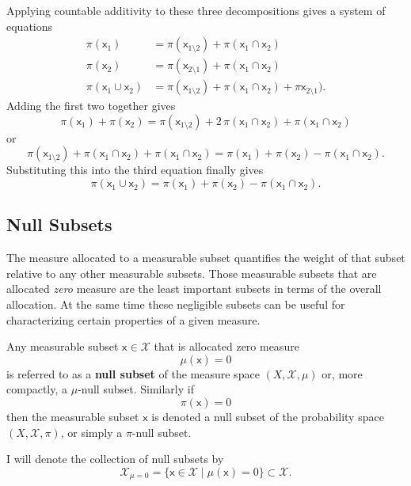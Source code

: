 \documentclass[
  letterpaper,
  DIV=11,
  numbers=noendperiod]{scrartcl}
\begin{document}
Applying countable additivity to these three decompositions gives a
system of equations \begin{align*}
\pi(\mathsf{x}_{1}) &=
\pi(\mathsf{x}_{1 \setminus 2}) + \pi(\mathsf{x}_{1} \cap \mathsf{x}_{2})
\\
\pi(\mathsf{x}_{2}) &=
\pi(\mathsf{x}_{2 \setminus 1}) + \pi(\mathsf{x}_{1} \cap \mathsf{x}_{2})
\\
\pi(\mathsf{x}_{1} \cup \mathsf{x}_{2}) &=
\pi(\mathsf{x}_{1 \setminus 2})
+ \pi(\mathsf{x}_{1} \cap \mathsf{x}_{2})
+ \pi \mathsf{x}_{2 \setminus 1}).
\end{align*} Adding the first two together gives \[
\pi(\mathsf{x}_{1}) + \pi(\mathsf{x}_{2})
=
\pi(\mathsf{x}_{1 \setminus 2})
+ 2 \, \pi(\mathsf{x}_{1} \cap \mathsf{x}_{2})
+ \pi(\mathsf{x}_{1} \cap \mathsf{x}_{2})
\] or \[
\pi(\mathsf{x}_{1 \setminus 2})
+ \pi(\mathsf{x}_{1} \cap \mathsf{x}_{2})
+ \pi(\mathsf{x}_{1} \cap \mathsf{x}_{2})
=
\pi(\mathsf{x}_{1}) + \pi(\mathsf{x}_{2})
- \pi(\mathsf{x}_{1} \cap \mathsf{x}_{2}).
\] Substituting this into the third equation finally gives \[
\pi(\mathsf{x}_{1} \cup \mathsf{x}_{2})
=
\pi(\mathsf{x}_{1}) + \pi(\mathsf{x}_{2})
- \pi(\mathsf{x}_{1} \cap \mathsf{x}_{2}).
\]

\hypertarget{sec:null}{%
\subsection{Null Subsets}\label{sec:null}}

The measure allocated to a measurable subset quantifies the weight of
that subset relative to any other measurable subsets. Those measurable
subsets that are allocated \emph{zero} measure are the least important
subsets in terms of the overall allocation. At the same time these
negligible subsets can be useful for characterizing certain properties
of a given measure.

Any measurable subset \(\mathsf{x} \in \mathcal{X}\) that is allocated
zero measure \[
\mu(\mathsf{x}) = 0
\] is referred to as a \textbf{null subset} of the measure space
\((X, \mathcal{X}, \mu)\) or, more compactly, a \(\mu\)-null subset.
Similarly if \[
\pi(\mathsf{x}) = 0
\] then the measurable subset \(\mathsf{x}\) is denoted a null subset of
the probability space \((X, \mathcal{X}, \pi)\), or simply a
\(\pi\)-null subset.

I will denote the collection of null subsets by \[
\mathcal{X}_{\mu = 0}
= \{ \mathsf{x} \in \mathcal{X} \mid \mu(\mathsf{x}) = 0 \}
\subset \mathcal{X}.
\]
\end{document}
